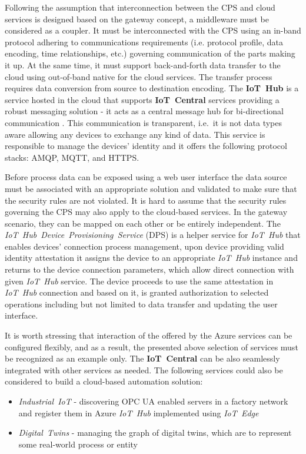 \documentclass[runningheads]{llncs}
\begin{document}
Following the assumption that interconnection between the CPS and cloud services is designed based on the gateway concept, a middleware must be considered as a coupler. It must be interconnected with the CPS using an in-band protocol adhering to communications requirements (i.e. protocol profile, data encoding, time relationships, etc.) governing communication of the parts making it up. At the same time, it must support back-and-forth data transfer to the cloud using out-of-band native for the cloud services. The transfer process requires data conversion from source to destination encoding. The \textbf{IoT\ Hub} is a service hosted in the cloud that supports \textbf{IoT\ Central} services providing a robust messaging solution - it acts as a central message hub for bi-directional communication \cite{MicrosoftAzureIoTPlatform}. This communication is transparent, i.e.~it is not data types aware allowing any devices to exchange any kind of data. This service is responsible to manage the devices' identity and it offers the following protocol stacks: AMQP, MQTT, and HTTPS.

Before process data can be exposed using a web user interface the data source must be associated with an appropriate solution and validated to make sure that the security rules are not violated. It is hard to assume that the security rules governing the CPS may also apply to the cloud-based services. In the gateway scenario, they can be mapped on each other or be entirely independent. The \emph{IoT\ Hub\ Device\ Provisioning\ Service} (DPS) is a helper service for \emph{IoT\ Hub} that enables devices' connection process management, upon device providing valid identity attestation it assigns the device to an appropriate \emph{IoT\ Hub} instance and returns to the device connection parameters, which allow direct connection with given \emph{IoT\ Hub} service. The device proceeds to use the same attestation in \emph{IoT\ Hub} connection and based on it, is granted authorization to selected operations including but not limited to data transfer and updating the user interface.

It is worth stressing that interaction of the offered by the Azure services can be configured flexibly, and as a result, the presented above selection of services must be recognized as an example only. The \textbf{IoT\ Central} can be also seamlessly integrated with other services as needed. The following services could also be considered to build a cloud-based automation solution:

\begin{itemize}
      \item \emph{Industrial\ IoT} - discovering OPC UA enabled servers in a factory network and register them in Azure \emph{IoT\ Hub} implemented using \emph{IoT\ Edge}
      \item \emph{Digital\ Twins} - managing the graph of digital twins, which are to represent some real-world process or entity
\end{itemize}
\end{document}
